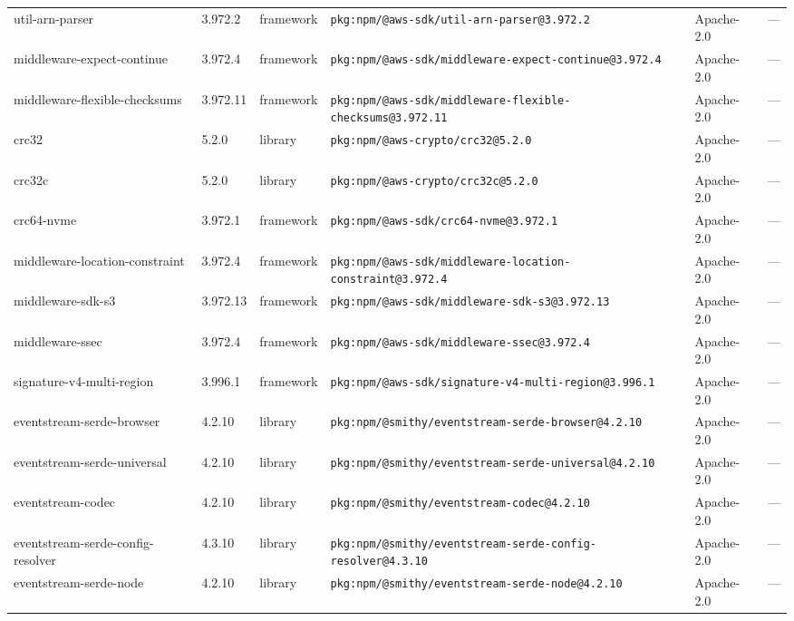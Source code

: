 \documentclass[11pt,a4paper]{article}
\begin{document}
\begin{longtable}{|p{4cm}|p{2cm}|p{1.6cm}|p{5cm}|p{1.5cm}|p{3.5cm}|}
\raggedright util-arn-parser & 3.972.2 & framework & \small\texttt{pkg:npm/@aws-sdk/util-arn-parser@3.972.2} & Apache-2.0 & \small — \\
\raggedright middleware-expect-continue & 3.972.4 & framework & \small\texttt{pkg:npm/@aws-sdk/middleware-expect-continue@3.972.4} & Apache-2.0 & \small — \\
\raggedright middleware-flexible-checksums & 3.972.11 & framework & \small\texttt{pkg:npm/@aws-sdk/middleware-flexible-checksums@3.972.11} & Apache-2.0 & \small — \\
\raggedright crc32 & 5.2.0 & library & \small\texttt{pkg:npm/@aws-crypto/crc32@5.2.0} & Apache-2.0 & \small — \\
\raggedright crc32c & 5.2.0 & library & \small\texttt{pkg:npm/@aws-crypto/crc32c@5.2.0} & Apache-2.0 & \small — \\
\raggedright crc64-nvme & 3.972.1 & framework & \small\texttt{pkg:npm/@aws-sdk/crc64-nvme@3.972.1} & Apache-2.0 & \small — \\
\raggedright middleware-location-constraint & 3.972.4 & framework & \small\texttt{pkg:npm/@aws-sdk/middleware-location-constraint@3.972.4} & Apache-2.0 & \small — \\
\raggedright middleware-sdk-s3 & 3.972.13 & framework & \small\texttt{pkg:npm/@aws-sdk/middleware-sdk-s3@3.972.13} & Apache-2.0 & \small — \\
\raggedright middleware-ssec & 3.972.4 & framework & \small\texttt{pkg:npm/@aws-sdk/middleware-ssec@3.972.4} & Apache-2.0 & \small — \\
\raggedright signature-v4-multi-region & 3.996.1 & framework & \small\texttt{pkg:npm/@aws-sdk/signature-v4-multi-region@3.996.1} & Apache-2.0 & \small — \\
\raggedright eventstream-serde-browser & 4.2.10 & library & \small\texttt{pkg:npm/@smithy/eventstream-serde-browser@4.2.10} & Apache-2.0 & \small — \\
\raggedright eventstream-serde-universal & 4.2.10 & library & \small\texttt{pkg:npm/@smithy/eventstream-serde-universal@4.2.10} & Apache-2.0 & \small — \\
\raggedright eventstream-codec & 4.2.10 & library & \small\texttt{pkg:npm/@smithy/eventstream-codec@4.2.10} & Apache-2.0 & \small — \\
\raggedright eventstream-serde-config-resolver & 4.3.10 & library & \small\texttt{pkg:npm/@smithy/eventstream-serde-config-resolver@4.3.10} & Apache-2.0 & \small — \\
\raggedright eventstream-serde-node & 4.2.10 & library & \small\texttt{pkg:npm/@smithy/eventstream-serde-node@4.2.10} & Apache-2.0 & \small — \\

\end{longtable}
\end{document}
